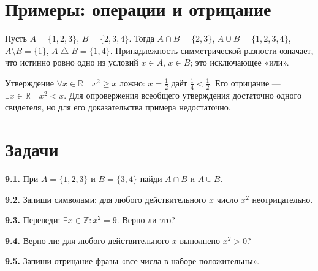 \section{Примеры: операции и отрицание}
\begin{example}Пусть \(A=\{1,2,3\}\), \(B=\{2,3,4\}\). Тогда \(A\cap B=\{2,3\}\), \(A\cup B=\{1,2,3,4\}\), \(A\setminus B=\{1\}\), \(A\mathbin{\triangle}B=\{1,4\}\). Принадлежность симметрической разности означает, что истинно ровно одно из условий \(x\in A\), \(x\in B\); это исключающее «или».\end{example}
\begin{example}Утверждение \(\forall x\in\mathbb R\quad x^2\ge x\) ложно: \(x=\frac12\) даёт \(\frac14<\frac12\). Его отрицание --- \(\exists x\in\mathbb R\quad x^2<x\). Для опровержения всеобщего утверждения достаточно одного свидетеля, но для его доказательства примера недостаточно.\end{example}
\section*{Задачи}
\begingroup\setlength{\parskip}{2pt}
\noindent\begin{minipage}[t]{\linewidth}\textbf{9.1.} При \(A = \{1,\allowbreak 2,\allowbreak 3\}\) и \(B = \{3,\allowbreak 4\}\) найди \(A \cap  B\) и \(A \cup  B\).\par\end{minipage}\par
\noindent\begin{minipage}[t]{\linewidth}\textbf{9.2.} Запиши символами: для любого действительного \(x\) число \(x^{2}\) неотрицательно.\par\end{minipage}\par
\noindent\begin{minipage}[t]{\linewidth}\textbf{9.3.} Переведи: \(\exists  x \in  \mathbb{Z} : x^{2} = 9\). Верно ли это?\par\end{minipage}\par
\noindent\begin{minipage}[t]{\linewidth}\textbf{9.4.} Верно ли: для любого действительного \(x\) выполнено \(x^{2} > 0\)?\par\end{minipage}\par
\noindent\begin{minipage}[t]{\linewidth}\textbf{9.5.} Запиши отрицание фразы «все числа в наборе положительны».\par\end{minipage}\par
